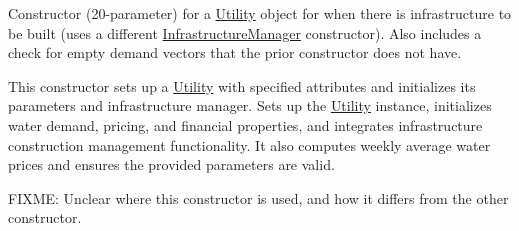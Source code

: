 Constructor (20-\/parameter) for a \mbox{\hyperlink{classUtility}{Utility}} object for when there is infrastructure to be built (uses a different \mbox{\hyperlink{classInfrastructureManager}{Infrastructure\+Manager}} constructor). Also includes a check for empty demand vectors that the prior constructor does not have. 

This constructor sets up a \mbox{\hyperlink{classUtility}{Utility}} with specified attributes and initializes its parameters and infrastructure manager. Sets up the \mbox{\hyperlink{classUtility}{Utility}} instance, initializes water demand, pricing, and financial properties, and integrates infrastructure construction management functionality. It also computes weekly average water prices and ensures the provided parameters are valid.

F\+I\+X\+ME\+: Unclear where this constructor is used, and how it differs from the other constructor.


